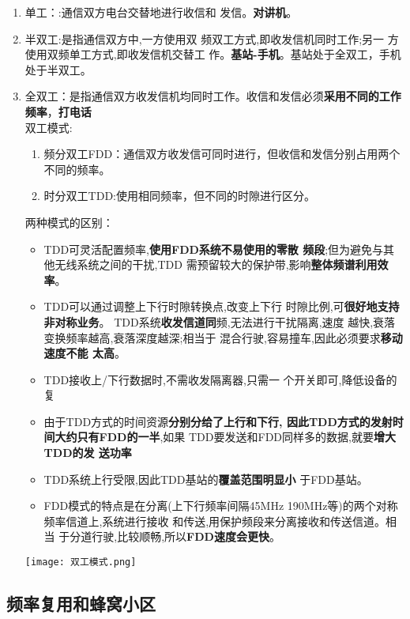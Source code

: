 	\begin{enumerate}
		\item 单工：:通信双方电台交替地进行收信和
		发信。\textbf{对讲机}。
		\item 半双工:是指通信双方中,一方使用双
		频双工方式,即收发信机同时工作;另一
		方使用双频单工方式,即收发信机交替工
		作。\textbf{基站-手机}。基站处于全双工，手机处于半双工。
		\item 全双工：是指通信双方收发信机均同时工作。收信和发信必须\textbf{采用不同的工作频率}，\textbf{打电话}	\\
		双工模式:
		\begin{enumerate}
		\item 频分双工FDD：通信双方收发信可同时进行，但收信和发信分别占用两个不同的频率。
		\item 时分双工TDD:使用相同频率，但不同的时隙进行区分。
		\end{enumerate}
		两种模式的区别：
		
		\begin{itemize}
			\item TDD可灵活配置频率,\textbf{使用FDD系统不易使用的零散
			频段};但为避免与其他无线系统之间的干扰,TDD
			需预留较大的保护带,影响\textbf{整体频谱利用效率}。
			\item TDD可以通过调整上下行时隙转换点,改变上下行
			时隙比例,可\textbf{很好地支持非对称业务}。
			TDD系统\textbf{收发信道同}频,无法进行干扰隔离,速度
			越快,衰落变换频率越高,衰落深度越深;相当于
			混合行驶,容易撞车,因此必须要求\textbf{移动速度不能
			太高}。
			\item TDD接收上/下行数据时,不需收发隔离器,只需一
			个开关即可,降低设备的复
			\item 由于TDD方式的时间资源\textbf{分别分给了上行和下行,
			因此TDD方式的发射时间大约只有FDD的一半},如果
			TDD要发送和FDD同样多的数据,就要\textbf{增大TDD的发
			送功率}
			\item TDD系统上行受限,因此TDD基站的\textbf{覆盖范围明显小}
			于FDD基站。
			\item FDD模式的特点是在分离(上下行频率间隔45MHz
			190MHz等)的两个对称频率信道上,系统进行接收
			和传送,用保护频段来分离接收和传送信道。相当
			于分道行驶,比较顺畅,所以\textbf{FDD速度会更快}。
		\end{itemize}
	
		\begin{center}
			\texttt{[image: 双工模式.png]}
		\end{center}
	\end{enumerate}
	\subsection{频率复用和蜂窝小区}
